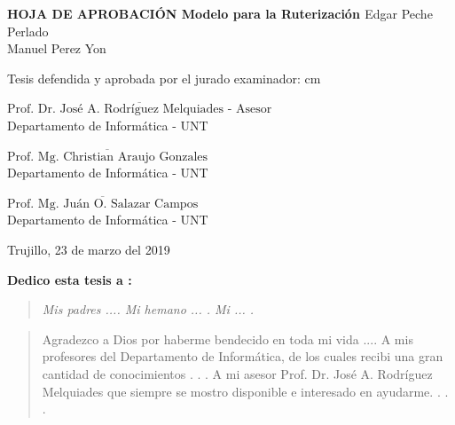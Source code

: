 \begin{center}
 {\bf {\Large HOJA DE APROBACIÓN }     
 \vskip 1.5cm
  {\Large Modelo para la Ruterización }}
 \vskip 1cm 
  {\large{Edgar Peche Perlado}}\\
    {\large{Manuel Perez Yon}}

 \vskip 1cm
\end{center} 
Tesis defendida y aprobada por el jurado examinador:
 cm
\begin{flushleft} 
$\overline{\mbox{Prof. Dr. José A. Rodríguez Melquiades - Asesor}}$\\
\vskip -0.5cm
Departamento de Informática - UNT
\end{flushleft} 
\vskip 1cm
\begin{flushleft} 
$\overline{\mbox{Prof. Mg. Christian Araujo Gonzales}}$\\
\vskip -0.5cm
Departamento de Informática - UNT
\end{flushleft} 
\vskip 1cm
\begin{flushleft} 
$\overline{\mbox{Prof. Mg. Juán O. Salazar Campos}}$\\
\vskip -0.5cm
Departamento de Informática - UNT
\end{flushleft}
\vskip 0.8cm 
\begin{center}    
Trujillo, 23 de marzo del 2019
\end{center} 
\newpage


 
 {\bf\Large {Dedico esta tesis a :}}
 \vskip 1cm
\begin{quotation}
{\it Mis padres ....
\vskip 1cm
Mi hemano ... .
\vskip 1cm
Mi ... .}
\end{quotation}


\newpage

 {\bf\Large {}}
 \vskip 1.5cm
\begin{quotation}
Agradezco a Dios por haberme bendecido en toda mi vida ....
{\vskip 1cm}
A mis profesores del Departamento de Informática, de los cuales recibi una gran cantidad de conocimientos  . . .
\vskip 1cm
A mi asesor Prof. Dr. José A. Rodríguez Melquiades que siempre se mostro disponible e interesado en ayudarme.
\vskip 1cm
 . . .
 \end{quotation}


